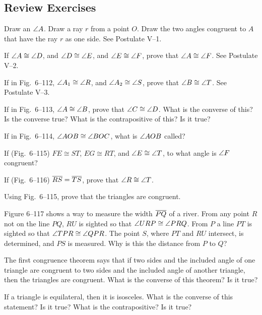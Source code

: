 \documentclass[11pt]{book}
\begin{document}
\subsection*{Review Exercises}
\begin{exlist}
\item Draw an $\angle A$. Draw a ray $r$ from a point $O$. Draw the two angles
  congruent to $A$ that have the ray $r$ as one side. See Postulate V--1.
\item If $\angle A \cong \angle D$, and $\angle D \cong \angle E$, and $\angle E
  \cong \angle F$, prove that $\angle A \cong \angle F$. See Postulate V--2.
\item If in Fig.~6--112, $\angle A_1 \cong \angle R$, and $\angle A_2 \cong
  \angle S$, prove that $\angle B \cong \angle T$. See Postulate V--3.
\exfig{\FIGVIONEHUNDREDTWELVE}
\item If in Fig.~6--113, $\angle A \cong \angle B$, prove that $\angle C \cong
  \angle D$. What is the converse of this? Is the converse true? What is the
  contrapositive of this? Is it true?
\exfig{\FIGVIONEHUNDREDTHIRTEEN}
\item If in Fig.~6--114, $\angle AOB \cong \angle BOC$, what is $\angle AOB$
  called?
\exfig{\FIGVIONEHUNDREDFOURTEEN}
\item If (Fig.~6--115) $FE \cong ST$, $EG \cong RT$, and $\angle E \cong
  \angle T$, to what angle is $\angle F$ congruent?
\exfig{\FIGVIONEHUNDREDFIFTEEN}
\item If (Fig.~6--116) $\overline{RS} = \overline{TS}$, prove that $\angle R \cong \angle T$.
\exfig{\FIGVIONEHUNDREDSIXTEEN}
\item Using Fig.~6--115, prove that the triangles are congruent.
\item Figure 6--117 shows a way to measure the width $\overline{PQ}$ of a river. From
  any point $R$ not on the line $PQ$, $RU$ is sighted so that $\angle URP \cong
  \angle PRQ$. From $P$ a line $PT$ is sighted so that $\angle TPR \cong
  \angle QPR$. The point $S$, where $PT$ and $RU$ intersect, is determined, and
  $PS$ is measured. Why is this the distance from $P$ to $Q$?
\exfig{\FIGVIONEHUNDREDSEVENTEEN}
\item The first congruence theorem says that if two sides and the included
  angle of one triangle are congruent to two sides and the included angle of
  another triangle, then the triangles are congruent. What is the converse of
  this theorem? Is it true?
\item If a triangle is equilateral, then it is isosceles. What is the converse
  of this statement? Is it true? What is the contrapositive? Is it true?

\end{exlist}
\end{document}

